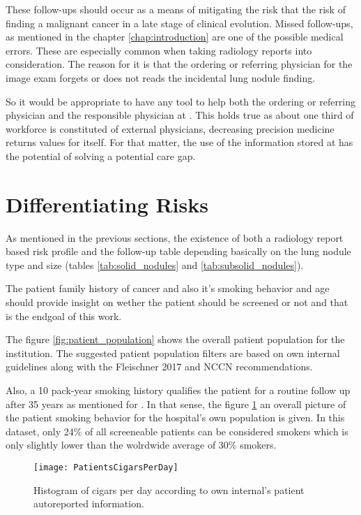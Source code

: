 These follow-ups should occur as a  means of mitigating the risk that the risk of finding a malignant cancer in a late stage of clinical evolution. Missed follow-ups, as mentioned in  the chapter \ref{chap:introduction} are one of the possible medical errors. These are especially common when taking radiology reports into consideration. The reason for it is that the ordering or referring physician for the image exam forgets or does not reads the incidental lung nodule finding. 

So it would be appropriate to have any tool to help both the ordering or referring physician and the responsible physician at \nomeHsl{}. This holds true as about one third of \nomeHslShort{} workforce is constituted of external physicians, decreasing precision medicine returns values for itself. For that matter, the use of the information stored at \nomeHslShort{} has the potential of solving a potential care gap. 

\section{Differentiating Risks}

As mentioned in the previous sections, the existence of both a radiology report based risk profile and the follow-up table depending basically on the lung nodule type and  size (tables \ref{tab:solid_nodules} and \ref{tab:subsolid_nodules}). 

The patient family history of cancer and also it's smoking behavior and age should provide insight on wether the patient should be screened or not and that is the endgoal of this work.

The figure \ref{fig:patient_population} shows the overall patient population for the institution. The suggested patient population filters are based on \nomeHslShort{} own internal guidelines along with the Fleischner 2017 and NCCN recommendations.

Also, a 10 pack-year smoking history qualifies the patient for a routine follow up after 35 years as mentioned for \nomeHslShort{}. In that sense, the figure \ref{fig:cigars_per_day} an overall picture of the patient smoking behavior for the hospital's own population is given. In this dataset, only 24\% of all screeneable patients can be considered smokers which is only slightly lower than the wolrdwide average of 30\% smokers.

\begin{center}
\begin{figure}
\begin{centering}
\texttt{[image: PatientsCigarsPerDay]}
\par\end{centering}
\caption{\label{fig:cigars_per_day} Histogram of cigars per day according to \nomeHsl{} own internal's
patient autoreported information.}
\end{figure}
\vspace*{-44pt}
\par\end{center}

